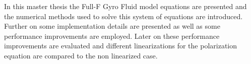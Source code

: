 \documentclass[master.tex]{subfiles}
\begin{document}
In this master thesis the Full-F Gyro Fluid model equations are presented and the numerical methods used to solve this system of equations are introduced. Further on some implementation details are presented as well as some performance improvements are employed. Later on these performance improvements are evaluated and different linearizations for the polarization equation are compared to the non linearized case.\newline
\end{document}
